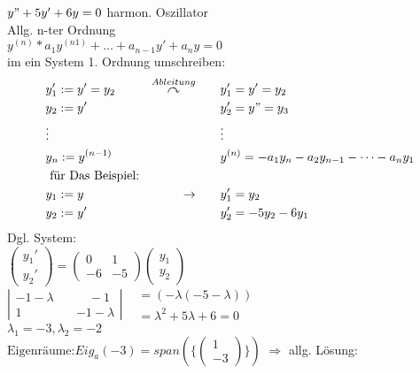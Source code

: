  \begin{example}
 	$y"+5y'+6y=0$ harmon. Oszillator\\
 	Allg. n-ter Ordnung \\
 	$y^(n)*a_1y^{(n1)}+\dots+ a_{n-1}y'+a_n y=0$\\
 	im ein System 1. Ordnung umschreiben:\\
\begin{align*}
	&y_1' := y' =y_2   				\quad & \overset{Ableitung}{\curvearrowright} \qquad  &y_1'=y'=y_2 \\
	&y_2:= y' 	  	  		 		 &	\quad		    						   &y_2'=y"=y_3   \\
 	&\vdots  		  		 		 & \quad    									   &\vdots      \\
 	&	y_n:= y^{(n-1)}				 & 	\quad				 		  &y^{(n)}=-a_1y_n-a_2y_{n-1}-\dots -a_n y_1\\
 	&\text{	für Das Beispiel:} 	  	 &	\quad		&\\
&y_1:= y             			 	\quad&\rightarrow \qquad 												&y_1'=y_2\\
&y_2:=y' 					        & \quad								&y_2'= -5y_2-6y_1
\end{align*}
Dgl. System:\\
$\begin{pmatrix}
y_1'\\
y_2'
\end{pmatrix}= \begin{pmatrix}
0   & 1\\
-6  &-5
\end{pmatrix}\begin{pmatrix}
y_1\\
y_2
\end{pmatrix}$\\
$\left| \begin{matrix}
	-1-  \lambda \quad &\quad-1\\
	1			 \quad &-1-\lambda
\end{matrix}\right| \begin{matrix}
					&= (-\lambda (-5-\lambda))\\
					&=\lambda^2 +5 \lambda +6=0
						\end{matrix}$\\
						$\lambda_1 =-3, \lambda_2=-2$\\
			$\text{Eigenräume:} Eig_a(-3)=span(\{ \begin{pmatrix} 1 \\ 
			-3 \end{pmatrix} \})$
		$\Rightarrow $ allg. Lösung:\\

\end{example}
